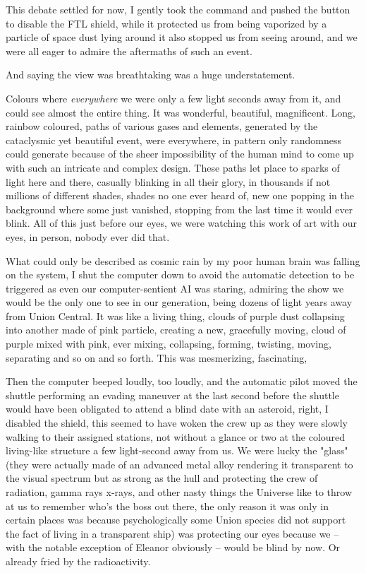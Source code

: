 \documentclass[colorlinks,12pt,a4paper]{book}
\begin{document}
 This debate settled for now, I gently took the command and pushed the button to disable the FTL shield, while it protected us from being vaporized by 
 a particle of space dust lying around it also stopped us from seeing around, and we were all eager to admire the aftermaths 
 of such an event.\par
 \bigskip
 
 And saying the view was breathtaking was a huge understatement.\par 
 \bigskip 
 
 Colours where \textit{everywhere} we were only a few light seconds away from it, and could see almost the entire thing. 
 It was wonderful, beautiful, magnificent. Long, rainbow coloured, paths of various gases and elements, generated by the 
 cataclysmic yet beautiful event, were everywhere, in pattern only randomness could generate because of the sheer impossibility 
 of the human mind to come up with such an intricate and complex design. These paths let place to sparks of light here and there, 
 casually blinking in all their glory, in thousands if not millions of different shades, shades no one ever heard of, new one 
 popping in the background where some just vanished, stopping from the last time it would ever blink. All of this 
 just before our eyes, we were watching this work of art with our eyes, in person, nobody ever did that.\par 
 \bigskip 
 
 What could only be described as cosmic rain by my poor human brain was falling on the system, I shut the computer down 
 to avoid the automatic detection to be triggered as even our computer-sentient AI was staring, admiring the show we would be 
 the only one to see in our generation, being dozens of light years away from Union Central. It was like a living thing, 
 clouds of purple dust collapsing into another made of pink particle, creating a new, gracefully moving, cloud of purple mixed 
 with pink, ever mixing, collapsing, forming, twisting, moving, separating and so on and so forth. This was mesmerizing, fascinating,\par
 \bigskip 
 
 Then the computer beeped loudly, too loudly, and the automatic pilot moved the shuttle performing an evading maneuver at the 
 last second before the shuttle would have been obligated to attend a blind date with an asteroid, right, I disabled the shield,
 this seemed to have woken the crew up as they were slowly walking to their assigned stations, not without a glance or two at the 
 coloured living-like structure a few light-second away from us. We were lucky the "glass" (they were actually made of an advanced 
 metal alloy rendering it transparent to the visual spectrum but as strong as the hull and protecting the crew of radiation, gamma rays 
 x-rays, and other nasty things the Universe like to throw at us to remember who's the boss out there, the only reason it was only 
 in certain places was because psychologically some Union species did not support the fact of living in a transparent ship) was protecting 
 our eyes because we -- with the notable exception of Eleanor obviously -- would be blind by now. Or already fried by the radioactivity.
 
\end{document}
